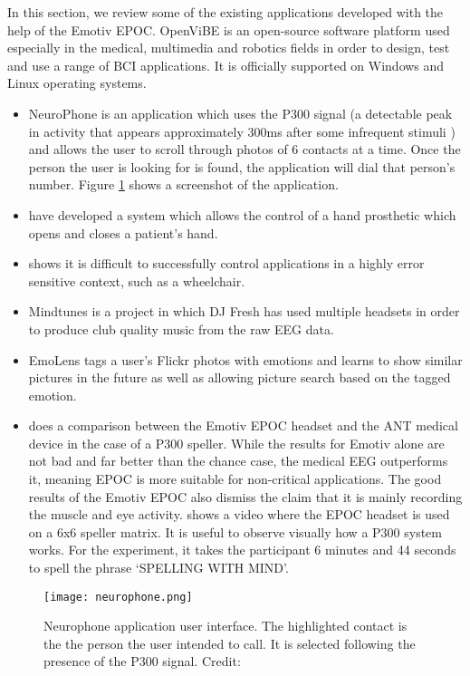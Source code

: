 In this section, we review some of the existing applications developed with the help of the Emotiv EPOC. OpenViBE \cite{openvibe} is an open-source software platform used especially in the medical, multimedia and robotics fields in order to design, test and use a range of BCI applications. It is officially supported on Windows and Linux operating systems.   

\begin{itemize}
	\item NeuroPhone \cite{neurophone} is an application which uses the P300 signal (a detectable peak in activity that appears approximately 300ms after some infrequent stimuli \cite{hons1201}) and allows the user to scroll through photos of 6 contacts at a time. Once the person the user is looking for is found, the application will dial that person's number. Figure \ref{fig:neurophone} shows a screenshot of the application. 
	\item \cite{handOrthotic} have developed a system which allows the control of a hand prosthetic which opens and closes a patient's hand.
	\item \cite{wheelchairEEG} shows it is difficult to successfully control applications in a highly error sensitive context, such as a wheelchair. 
	\item Mindtunes \cite{mindtunes} is a project in which DJ Fresh has used multiple headsets in order to produce club quality music from the raw EEG data.   
	\item EmoLens \cite{emoLens} tags a user's Flickr photos with emotions and learns to show similar pictures in the future as well as allowing picture search based on the tagged emotion.
	\item \cite{medicalcomparison} does a comparison between the Emotiv EPOC headset and the ANT medical device in the case of a P300 speller. While the results for Emotiv alone are not bad and far better than the chance case, the medical EEG outperforms it, meaning EPOC is more suitable for non-critical applications. The good results of the Emotiv EPOC also dismiss the claim that it is mainly recording the muscle and eye activity. \cite{spellerexample} shows a video where the EPOC headset is used on a 6x6 speller matrix. It is useful to observe visually how a P300 system works. For the experiment, it takes the participant 6 minutes and 44 seconds to spell the phrase `SPELLING WITH MIND'.
\end{itemize}

\begin{figure}
  \centering
  \texttt{[image: neurophone.png]}
  \caption{Neurophone application user interface. The highlighted contact is the the person the user intended to call. It is selected following the presence of the P300 signal. Credit: \cite{neurophone}}
    \label{fig:neurophone}          
\end{figure}